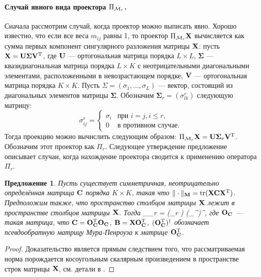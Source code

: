 \documentclass[12pt,a4paper,fleqn,leqno]{article}
\DeclareMathOperator{\tr}{tr}
\newtheorem{proposition}{Предложение}%
\begin{document}
\paragraph{Случай явного вида проектора $\Pi_{\mathcal{M}_r}$.} Сначала рассмотрим случай, когда проектор можно выписать явно.
Хорошо известно, что если все веса $m_{ij}$ равны 1, то проектор $\Pi_{\mathcal{M}_r} \mathbf{X}$
вычисляется как сумма первых компонент сингулярного разложения матрицы $\mathbf{X}$: пусть $\mathbf{X} = \mathbf{U} \mathbf{\Sigma} \mathbf{V}^{\mathrm{T}}$, где $\mathbf{U}$ --- ортогональная матрица порядка $L \times L$, $\mathbf{\Sigma}$ --- квазидиагональная матрица порядка $L \times K$ с неотрицательными диагональными элементами, расположенными в невозрастающем порядке, $\mathbf{V}$ --- ортогональная матрица порядка $K \times K$. Пусть $\Sigma = (\sigma_1, \ldots, \sigma_L)$ --- вектор, состоящий из диагональных элементов матрицы $\mathbf{\Sigma}$. Обозначим $\mathbf{\Sigma}_r = (\sigma^r_{l k})$ следующую матрицу:
\begin{equation*}
\sigma^r_{i j} = \begin{cases}
\sigma_i & \text{при $i = j, i \le r,$}\\
0 & \text{в противном случае}.
\end{cases}
\end{equation*}
Тогда проекцию можно вычислить следующим образом: $\Pi_{\mathcal{M}_r} \mathbf{X}  = \mathbf{U} \mathbf{\Sigma}_r \mathbf{V}^{\mathrm{T}}$.
Обозначим этот проектор как $\Pi_r$.
Следующее утверждение предложение описывает случаи, когда нахождение проектора
сводится к применению оператора $\Pi_r$. %

\begin{proposition}
\label{prop:projS}
Пусть существует симметричная, неотрицательно определённая матрица  $\mathbf{C}$ порядка $K \times K$,
такая что $\|\cdot\|_\bfM = \tr(\bfX \bfC \bfX^\rmT)$.
Предположим также, что пространство столбцов матрицы $\mathbf{X}$ лежит в пространстве столбцов матрицы $\mathbf{X}$.
Тогда 
\be
\label{eq:PiMr}
\Pi_{\calM_r} \bfX = (\Pi_r \bfB) (\bfO_\bfC^{\rmT})^\dagger,
\ee
где $\mathbf{O}_{\mathbf{C}}$ --- такая матрица, что $\mathbf{C} = \mathbf{O}_{\mathbf{C}}^{\mathrm{T}}\mathbf{O}_{\mathbf{C}}$,
$\mathbf{B} = \mathbf{X} \mathbf{O}_{\mathbf{C}}^{\mathrm{T}}$, $(\mathbf{O}_{\mathbf{C}}^{\mathrm{T}})^\dagger$ обозначает псевдообратную матрицу Мура-Пенроуза к матрице $\mathbf{O}_{\mathbf{C}}^{\mathrm{T}}$.
\end{proposition}
\begin{proof}
Доказательство является прямым следствием того, что рассматриваемая норма порождается косоугольным скалярным произведением в пространстве строк матрицы $\mathbf{X}$, см. детали в \cite{Golyandina2013}.
\end{proof}
\end{document}

